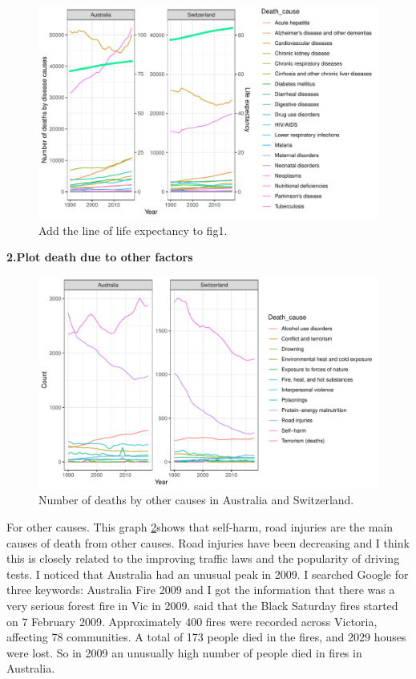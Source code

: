 \documentclass[11pt,a4paper,]{article}
\begin{document}
\begin{figure}
\centering
\includegraphics{Assignment4_files/figure-latex/diseaseplot1-1.pdf}
\caption{\label{fig:diseaseplot1}Add the line of life expectancy to fig1.}
\end{figure}

\textbf{2.Plot death due to other factors}

\begin{figure}
\centering
\includegraphics{Assignment4_files/figure-latex/otherplot-1.pdf}
\caption{\label{fig:otherplot}Number of deaths by other causes in Australia and Switzerland.}
\end{figure}

For other causes. This graph \ref{fig:otherplot}shows that self-harm, road injuries are the main causes of death from other causes. Road injuries have been decreasing and I think this is closely related to the improving traffic laws and the popularity of driving tests. I noticed that Australia had an unusual peak in 2009. I searched Google for three keywords: Australia Fire 2009 and I got the information that there was a very serious forest fire in Vic in 2009. \textcite{Bushfire} said that the Black Saturday fires started on 7 February 2009. Approximately 400 fires were recorded across Victoria, affecting 78 communities. A total of 173 people died in the fires, and 2029 houses were lost. So in 2009 an unusually high number of people died in fires in Australia.
\end{document}
